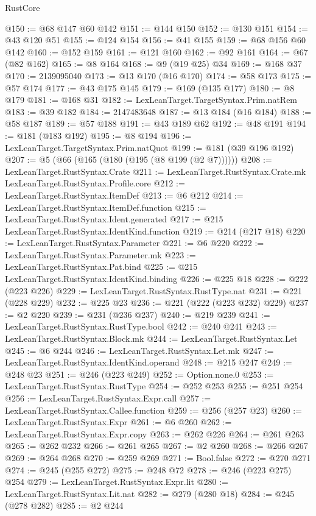 \begin{lexlean}{RustCore}
\begin{coremodule}
@150 := @68 @147 @60 @142
@151 := @144 @150
@152 := @130 @151
@154 := @43 @120 @51
@155 := @124 @154
@156 := @41 @155
@159 := @68 @156 @60 @142
@160 := @152 @159
@161 := @121 @160
@162 := @92 @161
@164 := @67 (@82 @162)
@165 := @8 @164
@168 := @9 (@19 @25) @34
@169 := @168 @37
@170 := 2139095040
@173 := @13 @170 (@16 @170)
@174 := @58 @173
@175 := @57 @174
@177 := @43 @175 @145
@179 := @169 (@135 @177)
@180 := @8 @179
@181 := @168 @31
@182 := LexLeanTarget.TargetSyntax.Prim.natRem
@183 := @39 @182
@184 := 2147483648
@187 := @13 @184 (@16 @184)
@188 := @58 @187
@189 := @57 @188
@191 := @43 @189 @62
@192 := @48 @191
@194 := @181 (@183 @192)
@195 := @8 @194
@196 := LexLeanTarget.TargetSyntax.Prim.natQuot
@199 := @181 (@39 @196 @192)
@207 := @5 (@66 (@165 (@180 (@195 (@8 @199 (@2 @7))))))
@208 := LexLeanTarget.RustSyntax.Crate
@211 := LexLeanTarget.RustSyntax.Crate.mk LexLeanTarget.RustSyntax.Profile.core
@212 := LexLeanTarget.RustSyntax.ItemDef
@213 := @6 @212
@214 := LexLeanTarget.RustSyntax.ItemDef.function
@215 := LexLeanTarget.RustSyntax.Ident.generated
@217 := @215 LexLeanTarget.RustSyntax.IdentKind.function
@219 := @214 (@217 @18)
@220 := LexLeanTarget.RustSyntax.Parameter
@221 := @6 @220
@222 := LexLeanTarget.RustSyntax.Parameter.mk
@223 := LexLeanTarget.RustSyntax.Pat.bind
@225 := @215 LexLeanTarget.RustSyntax.IdentKind.binding
@226 := @225 @18
@228 := @222 (@223 @226)
@229 := LexLeanTarget.RustSyntax.RustType.nat
@231 := @221 (@228 @229)
@232 := @225 @23
@236 := @221 (@222 (@223 @232) @229)
@237 := @2 @220
@239 := @231 (@236 @237)
@240 := @219 @239
@241 := LexLeanTarget.RustSyntax.RustType.bool
@242 := @240 @241
@243 := LexLeanTarget.RustSyntax.Block.mk
@244 := LexLeanTarget.RustSyntax.Let
@245 := @6 @244
@246 := LexLeanTarget.RustSyntax.Let.mk
@247 := LexLeanTarget.RustSyntax.IdentKind.operand
@248 := @215 @247
@249 := @248 @23
@251 := @246 (@223 @249)
@252 := Option.none.{0}
@253 := LexLeanTarget.RustSyntax.RustType
@254 := @252 @253
@255 := @251 @254
@256 := LexLeanTarget.RustSyntax.Expr.call
@257 := LexLeanTarget.RustSyntax.Callee.function
@259 := @256 (@257 @23)
@260 := LexLeanTarget.RustSyntax.Expr
@261 := @6 @260
@262 := LexLeanTarget.RustSyntax.Expr.copy
@263 := @262 @226
@264 := @261 @263
@265 := @262 @232
@266 := @261 @265
@267 := @2 @260
@268 := @266 @267
@269 := @264 @268
@270 := @259 @269
@271 := Bool.false
@272 := @270 @271
@274 := @245 (@255 @272)
@275 := @248 @72
@278 := @246 (@223 @275) @254
@279 := LexLeanTarget.RustSyntax.Expr.lit
@280 := LexLeanTarget.RustSyntax.Lit.nat
@282 := @279 (@280 @18)
@284 := @245 (@278 @282)
@285 := @2 @244

\end{coremodule}
\end{lexlean}
